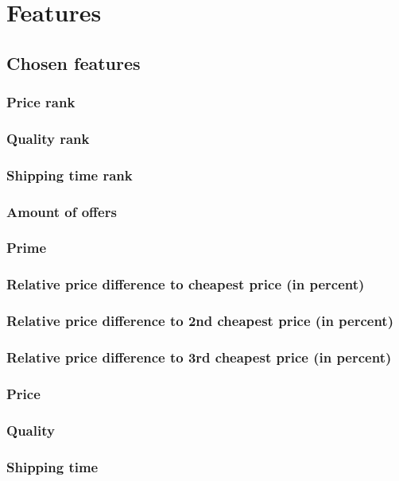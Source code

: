 \section{Features}
\subsection{Chosen features}
\subsubsection{Price rank}
\label{sec:pricerank}
\subsubsection{Quality rank}
\subsubsection{Shipping time rank}
\subsubsection{Amount of offers}
\subsubsection{Prime}
\subsubsection{Relative price difference to cheapest price (in percent)}
\subsubsection{Relative price difference to 2nd cheapest price (in percent)}
\subsubsection{Relative price difference to 3rd cheapest price (in percent)}
\label{sec:pricediff3}
\subsubsection{Price}
\subsubsection{Quality}
\subsubsection{Shipping time}
